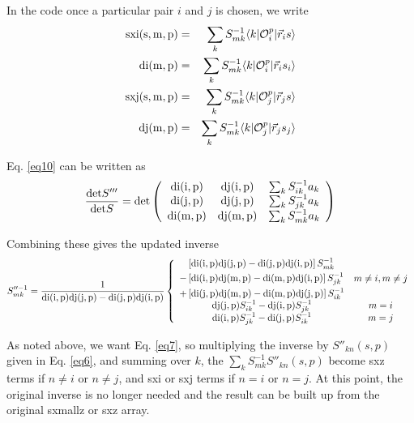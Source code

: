 \documentclass[12pt]{article}
\begin{document}
In the code once a particular pair $i$ and $j$ is chosen, we write
\begin{eqnarray}
{\rm sxi(s,m,p)} &=& \sum_k S^{-1}_{mk}\langle k|{\cal O}_i^p|\vec r_i s\rangle
\nonumber\\
{\rm di(m,p) } &=& \sum_k S^{-1}_{mk}\langle k|{\cal O}_i^p|\vec r_i s_i\rangle
\nonumber\\
{\rm sxj(s,m,p)} &=& \sum_k S^{-1}_{mk}\langle k|{\cal O}_j^p|\vec r_j s\rangle
\nonumber\\
{\rm dj(m,p) } &=& \sum_k S^{-1}_{mk}\langle k|{\cal O}_j^p|\vec r_j s_j\rangle
\end{eqnarray}

Eq. \ref{eq10} can be written as
\begin{equation}
\frac{{\rm det} S'''}{{\rm det} S} =
{\rm det} \left (
\begin{array}{ccc}
{\rm di(i,p)} & {\rm dj(i,p)} &\sum_k S^{-1}_{ik}a_k\\
{\rm di(j,p)} & {\rm dj(j,p)} &\sum_k S^{-1}_{jk}a_k\\
{\rm di(m,p)} & {\rm dj(m,p)} &\sum_k S^{-1}_{mk}a_k\\
\end{array}
\right )
\end{equation}

Combining these gives the updated inverse
\begin{equation}
S''^{-1}_{mk}=
\frac{1}{{\rm di(i,p)dj(j,p)-di(j,p)dj(i,p)}}
\left \{
\begin{array}{cc}
\begin{aligned}
&\left [{\rm di(i,p)dj(j,p)-di(j,p)dj(i,p)}\right ] S^{-1}_{mk} \\
-&\left [{\rm di(i,p)dj(m,p)-di(m,p)dj(i,p)}\right ] S^{-1}_{jk} \\
+&\left [{\rm di(j,p)dj(m,p)-di(m,p)dj(j,p)}\right ] S^{-1}_{ik}
\end{aligned}
& m \neq i, m \neq j\\
{\rm dj(j,p)}S^{-1}_{ik} -{\rm dj(i,p)}S^{-1}_{jk} & m=i\\
{\rm di(i,p)}S^{-1}_{jk}-{\rm di(j,p)}S^{-1}_{ik} & m=j\\
\end{array}
\right .
\end{equation}

As noted above, we want Eq. \ref{eq7}, so multiplying the inverse
by $S''_{kn}(s,p)$ given in Eq. \ref{eq6}, and summing over $k$,
the $\sum_k S^{-1}_{mk}S''_{kn}(s,p)$
become sxz terms if $n \neq i$ or $n \neq j$, and sxi or sxj terms
if $n=i$ or $n=j$. At this point, the original inverse is no longer
needed and the result can be built up from the original sxmallz or
sxz array.
\end{document}
